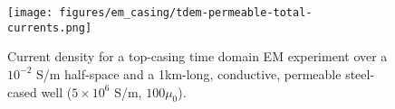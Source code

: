 \begin{figure}
    \begin{center}
    \texttt{[image: figures/em\_casing/tdem-permeable-total-currents.png]}
    \end{center}
\caption{
    Current density for a top-casing time domain EM experiment over a $10^{-2}$ S/m half-space and a 1km-long, conductive, permeable steel-cased well ($5 \times 10^{6}$ S/m, $100\mu_0$).
}
\label{fig:tdem-permeable-total-currents}
\end{figure}




